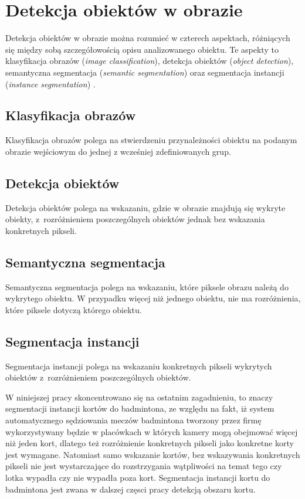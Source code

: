 \section{Detekcja obiektów w obrazie}
\label{sec:typy_detekcji}

Detekcja obiektów w obrazie można rozumieć w czterech aspektach, różniących się między sobą szczegółowością opisu analizowanego obiektu. Te aspekty to klasyfikacja obrazów (\textit{image classification}), detekcja obiektów (\textit{object detection}), semantyczna segmentacja (\textit{semantic segmentation}) oraz segmentacja instancji (\textit{instance segmentation}) \cite{survey-of-object-classification}.

\subsection*{Klasyfikacja obrazów}
Klasyfikacja obrazów polega na stwierdzeniu przynależności obiektu na podanym obrazie wejściowym do jednej z wcześniej zdefiniowanych grup.
\subsection*{Detekcja obiektów}
Detekcja obiektów polega na wskazaniu, gdzie w obrazie znajdują się wykryte obiekty, z~rozróżnieniem poszczególnych obiektów jednak bez wskazania konkretnych pikseli.
\subsection*{Semantyczna segmentacja}
Semantyczna segmentacja polega na wskazaniu, które piksele obrazu należą do wykrytego obiektu. W przypadku więcej niż jednego obiektu, nie ma rozróżnienia, które piksele dotyczą którego obiektu.
\subsection*{Segmentacja instancji}
Segmentacja instancji polega na wskazaniu konkretnych pikseli wykrytych obiektów z~rozróżnieniem poszczególnych obiektów.

W niniejszej pracy skoncentrowano się na ostatnim zagadnieniu,  to znaczy segmentacji instancji kortów do badmintona, ze względu na fakt, iż system automatycznego sędziowania meczów badmintona tworzony przez firmę \blue{} wykorzystywany będzie w placówkach w których kamery mogą obejmować więcej niż jeden kort, dlatego też rozróżnienie konkretnych pikseli jako konkretne korty jest wymagane. Natomiast samo wskazanie kortów, bez wskazywania konkretnych pikseli nie jest wystarczające do rozstrzygania wątpliwości na temat tego czy lotka wypadła czy nie wypadła poza kort. Segmentacja instancji kortu do badmintona jest zwana w dalszej częsci pracy detekcją obszaru kortu.
